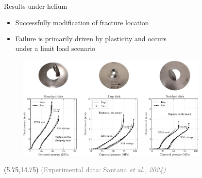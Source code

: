 \documentclass[9pt]{beamer}
\begin{document}
\begin{frame}{Results under helium}

\begin{itemize}
	\item Successfully modification of fracture location
	\vspace{0.15cm}
	\item Failure is primarily driven by plasticity and occurs \\ under a limit load scenario
\end{itemize}

\vspace{0.15cm}

\begin{figure}
	\centering
	\includegraphics[width=0.85\textwidth]{Images/disks_helium.pdf} \\
\end{figure}

    
    \begin{textblock}{6}(5.75,14.75)
        \textcolor{gray}{\scriptsize (Experimental data: Santana \textit{et al., 2024)}}
    \end{textblock}

\end{frame}

\end{document}
